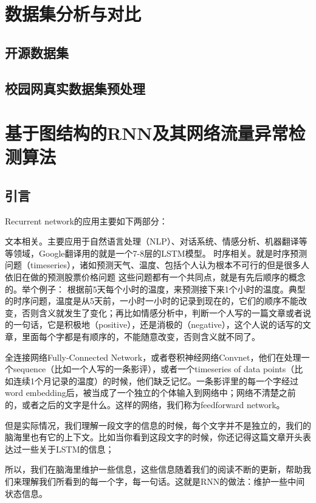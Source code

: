 \chapter{数据集分析与对比}
\section{开源数据集}

\section{校园网真实数据集预处理}

\chapter{基于图结构的RNN及其网络流量异常检测算法}

\section{引言}
Recurrent network的应用主要如下两部分：

文本相关。主要应用于自然语言处理（NLP）、对话系统、情感分析、机器翻译等等领域，Google翻译用的就是一个7-8层的LSTM模型。
时序相关。就是时序预测问题（timeseries），诸如预测天气、温度、包括个人认为根本不可行的但是很多人依旧在做的预测股票价格问题
这些问题都有一个共同点，就是有先后顺序的概念的。举个例子： 根据前5天每个小时的温度，来预测接下来1个小时的温度。典型的时序问题，温度是从5天前，一小时一小时的记录到现在的，它们的顺序不能改变，否则含义就发生了变化；再比如情感分析中，判断一个人写的一篇文章或者说的一句话，它是积极地（positive），还是消极的（negative），这个人说的话写的文章，里面每个字都是有顺序的，不能随意改变，否则含义就不同了。

全连接网络Fully-Connected Network，或者卷积神经网络Convnet，他们在处理一个sequence（比如一个人写的一条影评），或者一个timeseries of data points（比如连续1个月记录的温度）的时候，他们缺乏记忆。一条影评里的每一个字经过word embedding后，被当成了一个独立的个体输入到网络中；网络不清楚之前的，或者之后的文字是什么。这样的网络，我们称为feedforward network。

但是实际情况，我们理解一段文字的信息的时候，每个文字并不是独立的，我们的脑海里也有它的上下文。比如当你看到这段文字的时候，你还记得这篇文章开头表达过一些关于LSTM的信息；

所以，我们在脑海里维护一些信息，这些信息随着我们的阅读不断的更新，帮助我们来理解我们所看到的每一个字，每一句话。这就是RNN的做法：维护一些中间状态信息。
